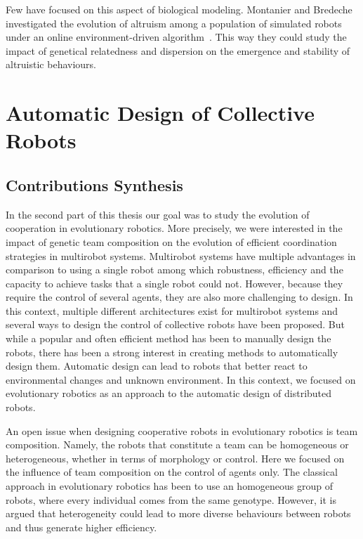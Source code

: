 			Few have focused on this aspect of biological modeling. Montanier and Bredeche investigated the evolution of altruism among a population of simulated robots under an online environment-driven algorithm~\parencite{Montanier2011, Montanier2013}. This way they could study the impact of genetical relatedness and dispersion on the emergence and stability of altruistic behaviours.


\section{Automatic Design of Collective Robots}

	\subsection{Contributions Synthesis}

		In the second part of this thesis our goal was to study the evolution of cooperation in evolutionary robotics. More precisely, we were interested in the impact of genetic team composition on the evolution of efficient coordination strategies in multirobot systems. Multirobot systems have multiple advantages in comparison to using a single robot among which robustness, efficiency and the capacity to achieve tasks that a single robot could not. However, because they require the control of several agents, they are also more challenging to design. In this context, multiple different architectures exist for multirobot systems and several ways to design the control of collective robots have been proposed. But while a popular and often efficient method has been to manually design the robots, there has been a strong interest in creating methods to automatically design them. Automatic design can lead to robots that better react to environmental changes and unknown environment. In this context, we focused on evolutionary robotics as an approach to the automatic design of distributed robots.

		An open issue when designing cooperative robots in evolutionary robotics is team composition. Namely, the robots that constitute a team can be homogeneous or heterogeneous, whether in terms of morphology or control. Here we focused on the influence of team composition on the control of agents only. The classical approach in evolutionary robotics has been to use an homogeneous group of robots, where every individual comes from the same genotype. However, it is argued that heterogeneity could lead to more diverse behaviours between robots and thus generate higher efficiency.

